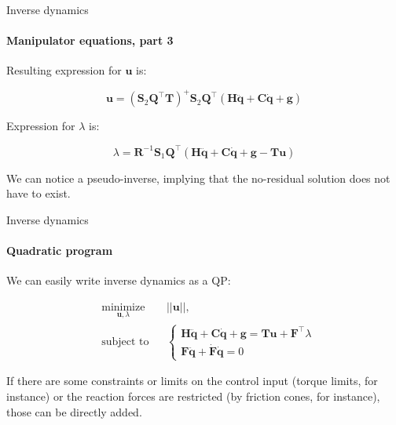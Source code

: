 \documentclass{beamer}
\begin{document}
\begin{frame}{Inverse dynamics}
\framesubtitle{Manipulator equations, part 3}
\begin{flushleft}

Resulting expression for $\mathbf{u}$ is:

\begin{equation}
    \mathbf{u} = 
    (\mathbf{S}_2\mathbf{Q}^\top\mathbf{T})^+ \mathbf{S}_2 \mathbf{Q}^\top (\mathbf{H}\ddot{\mathbf{q}} + \mathbf{C}\dot{\mathbf{q}} + \mathbf{g})
\end{equation}

Expression for $\lambda$ is:

\begin{equation}
\lambda = \mathbf{R}^{-1} \mathbf{S}_1 \mathbf{Q}^\top (\mathbf{H}\ddot{\mathbf{q}} + \mathbf{C}\dot{\mathbf{q}} + \mathbf{g} - \mathbf{T}\mathbf{u})
\end{equation}

We can notice a pseudo-inverse, implying that the no-residual solution does not have to exist.

\end{flushleft}
\end{frame}



\begin{frame}{Inverse dynamics}
\framesubtitle{Quadratic program}
\begin{flushleft}

We can easily write inverse dynamics as a QP:


\begin{equation}
\begin{aligned}
& \underset{\mathbf{u}, \lambda}{\text{minimize}}
& & ||\mathbf{u}||, \\
& \text{subject to}
& & \begin{cases}
    \mathbf{H}\ddot{\mathbf{q}} + \mathbf{C}\dot{\mathbf{q}} + \mathbf{g} = \mathbf{T}\mathbf{u} + \mathbf{F}^\top \lambda \\
    \mathbf{F}\ddot{\mathbf{q}} + \dot{\mathbf{F}}\dot{\mathbf{q}} = 0
    \end{cases}
\end{aligned}
\end{equation}

If there are some constraints or limits on the control input (torque limits, for instance) or the reaction forces are restricted (by friction cones, for instance), those can be directly added.

\end{flushleft}
\end{frame}
\end{document}
